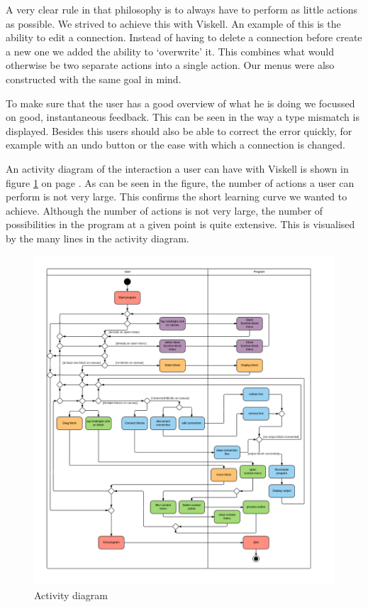 A very clear rule in that philosophy is to always have to perform as little actions as possible. We strived to achieve this with Viskell. An example of this is the ability to edit a connection. Instead of having to delete a connection before create a new one we added the ability to `overwrite' it. This combines what would otherwise be two separate actions into a single action. Our menus were also constructed with the same goal in mind.

To make sure that the user has a good overview of what he is doing we focussed on good, instantaneous feedback. This can be seen in the way a type mismatch is displayed. Besides this users should also be able to correct the error quickly, for example with an undo button or the ease with which a connection is changed.

An activity diagram of the interaction a user can have with Viskell is shown in figure \ref{fig:activitydiagram} on page \pageref{fig:activitydiagram}. As can be seen in the figure, the number of actions a user can perform is not very large. This confirms the short learning curve we wanted to achieve. Although the number of actions is not very large, the number of possibilities in the program at a given point is quite extensive. This is visualised by the many lines in the activity diagram.

\begin{figure}[p]
	\centering
	\includegraphics[width=\textwidth]{Images/activitydiagram}
	\caption{Activity diagram}
	\label{fig:activitydiagram}
\end{figure}

